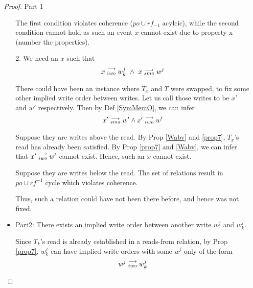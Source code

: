 \begin{proof}{Part 1}
\begin{itemize}
                        The first condition violates coherence ($po \cup rf_{-1}$ acylcic), while the second condition cannot hold as such an event $x$ cannot exist due to property x (number the properties).


                        2. We need an $x$ such that 
                        \begin{align*}
                            \reln{x}{iwo}{w_k^j} \ \wedge \ \reln{x}{smo}{w^j}
                        \end{align*}

                        There could have been an instance where $T_x$ and $T$ were swapped, to fix some other implied write order between writes. 
                        Let us call those writes to be $x'$ and $w'$ respectively.
                        Then by Def \ref{SymMemO}, we can infer 
                        \begin{align*}
                            x'\stackrel{\longrightarrow}{_{smo}}w' \wedge x'\stackrel{\longrightarrow}{_{iwo}}w'
                        \end{align*}
                        
                        Suppose they are writes above the read.                         
                        By Prop \ref{Wabv} and \ref{prop7}, $T_x$'s read has already been satisfied. By Prop \ref{prop7} and \ref{Wabv}, we can infer that $x'\stackrel{\longrightarrow}{_{iwo}}w'$ cannot exist. Hence, such an $x$ cannot exist. 
                        
                        Suppose they are writes below the read.
                        The set of relations result in $po \cup rf^{-1}$ cycle which violates coherence.  

                        

                        Thus, such a relation could have not been there before, and hence was not fixed. 


                    \item Part2: There exists an implied write order between another write $w^j$ and $w_k^j$.

                        Since $T_k$'s read is already established in a reads-from relation, by Prop \ref{prop7}, $w_k^j$ can have implied   write     orders with some $w^j$ only of the form 
                        \begin{align*}
                            w^j\stackrel{\longrightarrow}{_{iwo}}w_k^j
                        \end{align*}


\end{itemize}
\end{proof}
